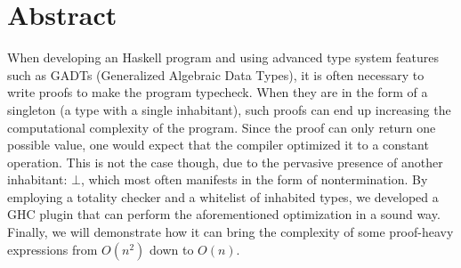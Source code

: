 \chapter*{Abstract}
\label{abstract}


When developing an Haskell program and using advanced type system features such as GADTs (Generalized Algebraic Data Types), it is often necessary to write proofs to make the program typecheck.
When they are in the form of a singleton (a type with a single inhabitant), such proofs can end up increasing the computational complexity of the program.
Since the proof can only return one possible value, one would expect that the compiler optimized it to a constant operation.
This is not the case though, due to the pervasive presence of another inhabitant: $\bot$, which most often manifests in the form of nontermination.
By employing a totality checker and a whitelist of inhabited types, we developed a GHC plugin that can perform the aforementioned optimization in a sound way.
Finally, we will demonstrate how it can bring the complexity of some proof-heavy expressions from $O(n^2)$ down to $O(n)$.

